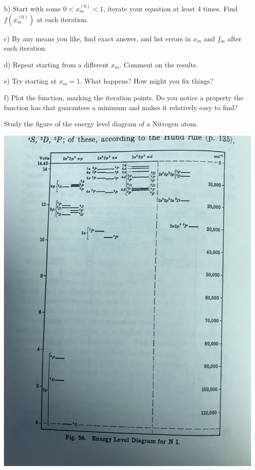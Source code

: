 b) Start with some  $0 < x^{(0)}_m < 1$, iterate your equation at least 4 times. Find
$f(x^{(0)}_m)$ at each iteration.

c) By any means you like, find exact answer, and list errors in $x_m$ and
$f_m$ after each iteration.

d) Repeat starting from a different $x_m$. Comment on the results.

e) Try starting at $x_m=1$.  What happens? How might you fix things?

f) Plot the function, marking the iteration
points.  Do you notice a property the function has that guarantees
a minimum and makes it relatively easy to find?

\newpage
{}

Study the figure of the energy level diagram of a Nitrogen atom.
\begin{center}
\includegraphics[scale=0.1]{spectrumN}
\end{center}

